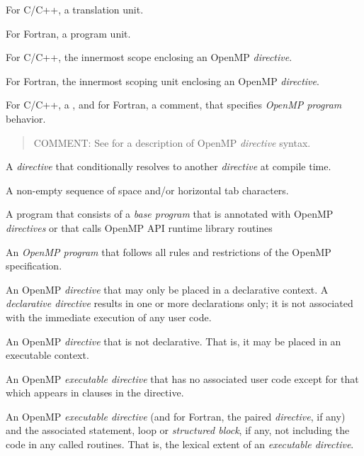 \glossarydefstart
For C/C++, a translation unit.

For Fortran, a program unit.
\glossarydefend

\glossarydefstart
For C/C++, the innermost scope enclosing an OpenMP \emph{directive}.

For Fortran, the innermost scoping unit enclosing an OpenMP \emph{directive}.
\glossarydefend

\glossarydefstart
For C/C++, a , and for Fortran, a comment, that 
specifies \emph{OpenMP program} behavior.

\begin{quote}
COMMENT: See  for a description of OpenMP 
\emph{directive} syntax. 
\end{quote}
\glossarydefend

\glossarydefstart
A \emph{directive} that conditionally resolves to another \emph{directive} 
at compile time.
\glossarydefend


\glossarydefstart
A non-empty sequence of space and/or horizontal tab characters.
\glossarydefend

\glossarydefstart
A program that consists of a \emph{base program} that is annotated with OpenMP
\emph{directives} or that calls OpenMP API runtime library routines
\glossarydefend

\glossarydefstart
An \emph{OpenMP program} that follows all rules and restrictions of the OpenMP
specification.
\glossarydefend

\glossarydefstart
An OpenMP \emph{directive} that may only be placed in a declarative context. A
\emph{declarative directive} results in one or more declarations only; it is 
not associated with the immediate execution of any user code.
\glossarydefend

\glossarydefstart
An OpenMP \emph{directive} that is not declarative. That is, it may be 
placed in an executable context.
\glossarydefend

\glossarydefstart
An OpenMP \emph{executable directive} that has no associated user
code except for that which appears in clauses in the directive.
\glossarydefend


\glossarydefstart
An OpenMP \emph{executable directive} (and for Fortran, the paired 
 \emph{directive}, if any) and the associated statement, 
loop or \emph{structured block}, if any, not including the code in 
any called routines. That is, the lexical extent of an \emph{executable
directive}.
\glossarydefend

